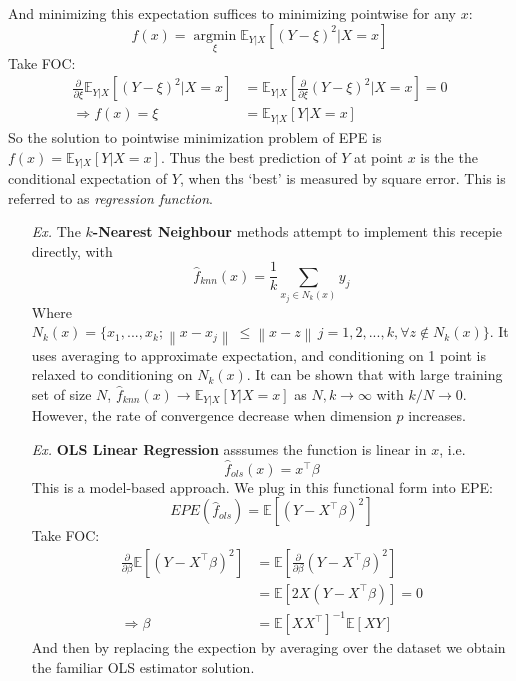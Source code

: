 \documentclass[a4paper, 11pt]{article}
\DeclareMathOperator*{\argmin}{argmin}
\begin{document}
And minimizing this expectation suffices to minimizing pointwise for any $x$:
\begin{equation}
	f(x) = \argmin\limits_{\xi}\mathbb{E}_{Y|X}\left[(Y-\xi)^2|X=x\right]
\end{equation}
Take FOC: 
\begin{equation}
	\begin{split}
		\frac{\partial }{\partial \xi} \mathbb{E}_{Y|X}\left[(Y-\xi)^2|X=x\right] &= \mathbb{E}_{Y|X}\left[\frac{\partial }{\partial \xi}(Y-\xi)^2|X=x\right] = 0 \\
		\Rightarrow f(x) = \xi &= \mathbb{E}_{Y|X}\left[Y|X=x\right]
	\end{split}
\end{equation}
So the solution to pointwise minimization problem of EPE is $f(x)=\mathbb{E}_{Y|X}\left[Y|X=x\right]$. Thus the best prediction of $Y$ at point $x$ is the the conditional expectation of $Y$, when ths `best' is measured by square error. This is referred to as \emph{regression function}.

\begin{itemize}
	\item[\textit{Ex.}] The \textbf{$k$-Nearest Neighbour} methods attempt to implement this recepie directly, with
	$$
	\hat{f}_{knn}(x) = \frac{1}{k}\sum_{x_j \in N_k(x)} y_j
	$$
	Where $N_k(x)=\{x_1, ..., x_{k}; \left\|x-x_j\right\|\ \leq \left\|x-z\right\|\, j=1,2,...,k, \forall z\notin N_k(x)\}$. It uses averaging to approximate expectation, and conditioning on 1 point is relaxed to conditioning on $N_k(x)$. It can be shown that with large training set of size $N$, $\hat{f}_{knn}(x)\to \mathbb{E}_{Y|X}\left[Y|X=x\right]$ as $N,k\to \infty$ with $k/N \to 0$. However, the rate of convergence decrease when dimension $p$ increases.

	\item[\textit{Ex.}] \textbf{OLS Linear Regression} asssumes the function is linear in $x$, i.e.
	$$
	\hat{f}_{ols}(x) = x^{\top} \beta 
	$$
	This is a model-based approach. We plug in this functional form into EPE:
	\begin{equation}
		EPE(\hat{f}_{ols}) = \mathbb{E}\left[(Y- X^{\top}\beta )^2\right]
	\end{equation}
	Take FOC: 
	\begin{equation}
		\begin{split}
			\frac{\partial }{\partial \beta} \mathbb{E}\left[(Y- X^{\top}\beta )^2\right] &= \mathbb{E}\left[\frac{\partial }{\partial \beta}(Y- X^{\top}\beta )^2\right] \\
			&= \mathbb{E}\left[2 X(Y- X^{\top}\beta )\right] = 0\\
			\Rightarrow \beta &= \mathbb{E}\left[X X^{\top}\right]^{-1} \mathbb{E}\left[XY \right]
		\end{split}
	\end{equation}
	And then by replacing the expection by averaging over the dataset we obtain the familiar OLS estimator solution.
\end{itemize}
\end{document}
